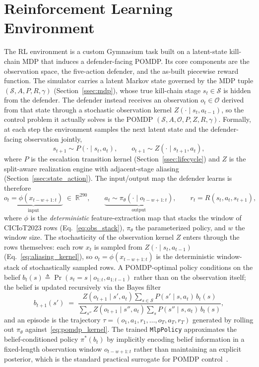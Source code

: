 \section{Reinforcement Learning Environment}\label{sec:rl_environment}
The RL environment is a custom Gymnasium task built on a latent-state kill-chain MDP that induces a defender-facing POMDP. Its core components are the observation space, the five-action defender, and the as-built piecewise reward function. The simulator carries a latent Markov state governed by the MDP tuple $(\mathcal{S}, A, P, R, \gamma)$ (Section~\ref{ssec:mdp}), whose true kill-chain stage $s_t \in \mathcal{S}$ is hidden from the defender. The defender instead receives an observation $o_t \in \mathcal{O}$ derived from that state through a stochastic observation kernel $Z(\cdot \mid s_t, a_{t-1})$, so the control problem it actually solves is the POMDP $(\mathcal{S}, A, \mathcal{O}, P, Z, R, \gamma)$. Formally, at each step the environment samples the next latent state and the defender-facing observation jointly,
\begin{equation}\label{eq:pomdp_kernel}
s_{t+1} \sim P(\cdot \mid s_t, a_t), \qquad o_{t+1} \sim Z(\cdot \mid s_{t+1}, a_t),
\end{equation}
where $P$ is the escalation transition kernel (Section~\ref{ssec:lifecycle}) and $Z$ is the split-aware realization engine with adjacent-stage aliasing (Section~\ref{ssec:state_action}). The input/output map the defender learns is therefore
\begin{equation}\label{eq:io_map}
\underbrace{o_t = \phi(x_{t-w+1:t})}_{\text{input}} \;\in\; \mathbb{R}^{290}, \qquad \underbrace{a_t \sim \pi_{\theta}(\cdot \mid o_{t-w+1:t})}_{\text{output}}, \qquad r_t = R(s_t, a_t, s_{t+1}),
\end{equation}
where $\phi$ is the \emph{deterministic} feature-extraction map that stacks the window of CICIoT2023 rows (Eq.~\eqref{eq:obs_stack}), $\pi_{\theta}$ the parameterized policy, and $w$ the window size. The stochasticity of the observation kernel $Z$ enters through the rows themselves: each row $x_t$ is sampled from $Z(\cdot \mid s_t, a_{t-1})$ (Eq.~\eqref{eq:aliasing_kernel}), so $o_t = \phi(x_{t-w+1:t})$ is the deterministic window-stack of stochastically sampled rows. A POMDP-optimal policy conditions on the belief $b_t(s) \triangleq \Pr(s_t = s \mid o_{1:t}, a_{1:t-1})$ rather than on the observation itself; the belief is updated recursively via the Bayes filter
\begin{equation}\label{eq:belief_update}
b_{t+1}(s') \;=\; \frac{Z(o_{t+1} \mid s', a_t) \sum_{s \in \mathcal{S}} P(s' \mid s, a_t)\, b_t(s)}{\sum_{s''} Z(o_{t+1} \mid s'', a_t) \sum_{s} P(s'' \mid s, a_t)\, b_t(s)},
\end{equation}
and an episode is the trajectory $\tau = (o_1, a_1, r_1, \dots, o_T, a_T, r_T)$ generated by rolling out $\pi_\theta$ against~\eqref{eq:pomdp_kernel}. The trained \texttt{MlpPolicy} approximates the belief-conditioned policy $\pi^*(b_t)$ by implicitly encoding belief information in a fixed-length observation window $o_{t-w+1:t}$ rather than maintaining an explicit posterior, which is the standard practical surrogate for POMDP control~\cite{Sutton2018}.

